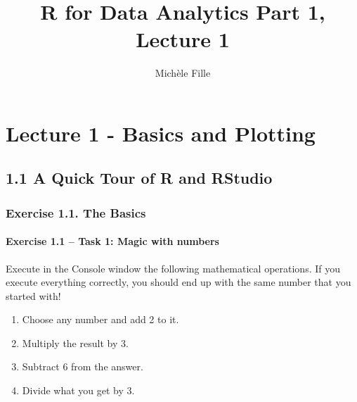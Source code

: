 \documentclass[
  letterpaper,
  DIV=11,
  numbers=noendperiod]{scrartcl}
\title{R for Data Analytics Part 1, Lecture 1}
\author{Michèle Fille}
\date{}
\let\oldparagraph\paragraph
\renewcommand{\paragraph}[1]{\oldparagraph{#1}\mbox{}}
\renewcommand*\contentsname{Table of contents}
\newcommand\contentsname{Table of contents}
\begin{document}
\maketitle
\ifdefined\Shaded\renewenvironment{Shaded}{\begin{tcolorbox}[frame hidden, enhanced, borderline west={3pt}{0pt}{shadecolor}, interior hidden, breakable, boxrule=0pt, sharp corners]}{\end{tcolorbox}}\fi

\renewcommand*\contentsname{Table of contents}
{
\hypersetup{linkcolor=}
\setcounter{tocdepth}{4}
\tableofcontents
}
\hypertarget{lecture-1---basics-and-plotting}{%
\section{Lecture 1 - Basics and
Plotting}\label{lecture-1---basics-and-plotting}}

\hypertarget{a-quick-tour-of-r-and-rstudio}{%
\subsection{1.1 A Quick Tour of R and
RStudio}\label{a-quick-tour-of-r-and-rstudio}}

\hypertarget{exercise-1.1.-the-basics}{%
\subsubsection{Exercise 1.1. The
Basics}\label{exercise-1.1.-the-basics}}

\hypertarget{exercise-1.1-task-1-magic-with-numbers}{%
\paragraph{Exercise 1.1 -- Task 1: Magic with
numbers}\label{exercise-1.1-task-1-magic-with-numbers}}

Execute in the Console window the following mathematical operations. If
you execute everything correctly, you should end up with the same number
that you started with!

\begin{enumerate}
\def\labelenumi{\arabic{enumi}.}
\item
  Choose any number and add 2 to it.
\item
  Multiply the result by 3.
\item
  Subtract 6 from the answer.
\item
  Divide what you get by 3.
\end{enumerate}
\end{document}
